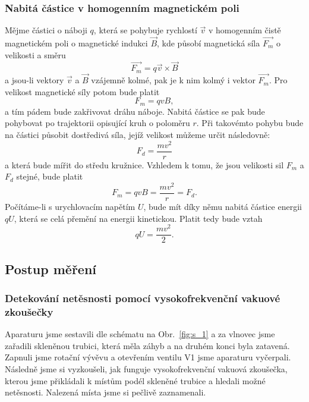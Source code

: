 \documentclass[english]{article}
\begin{document}
		\subsubsection{Nabitá částice v homogenním magnetickém poli}
			Mějme částici o náboji $q$, která se pohybuje rychlostí $\vec{v}$ v homogenním čistě magnetickém poli o magnetické indukci $\vec{B}$, kde působí magnetická síla $\vec{F_m}$ o velikosti a směru
			\begin{equation}
				\vec{F_m} = q\vec{v}\times\vec{B}
			\end{equation}
			a jsou-li vektory $\vec{v}$ a $\vec{B}$ vzájemně kolmé, pak je k nim kolmý i vektor $\vec{F_m}$. Pro velikost magnetické síly potom bude platit
			\begin{equation}
				F_m=qvB,
			\end{equation}
			a tím pádem bude zakřivovat dráhu náboje. Nabitá částice se pak bude pohybovat po trajektorii opisující kruh o poloměru $r$. Při takovémto pohybu bude na částici působit dostředivá síla, jejíž velikost můžeme určit následovně:
			\begin{equation}
				F_d=\frac{mv^2}{r}
			\end{equation}
			a která bude mířit do středu kružnice. Vzhledem k tomu, že jsou velikosti sil $F_m$ a $F_d$ stejné, bude platit
			\begin{equation}
			F_m=qvB=\frac{mv^2}{r}=F_d.
			\label{eq:1_qvB}
			\end{equation}
			Počítáme-li s urychlovacím napětím $U$, bude mít díky němu nabitá částice energii $qU$, která se celá přemění na energii kinetickou. Platit tedy bude vztah
			\begin{equation}
				qU=\frac{mv^2}{2}.
			\label{eq:2_qU}
			\end{equation}
			
	\subsection{Postup měření}
		\subsubsection{Detekování netěsnosti pomocí vysokofrekvenční vakuové zkoušečky}
			Aparaturu jsme sestavili dle schématu na Obr.~\ref{fig:s_1} a za vlnovec jsme zařadili skleněnou trubici, která měla záhyb a na druhém konci byla zatavená. Zapnuli jsme rotační vývěvu a otevřením ventilu V1 jsme aparaturu vyčerpali. Následně jsme si vyzkoušeli, jak funguje vysokofrekvenční vakuová zkoušečka, kterou jsme přikládali k místům podél skleněné trubice a hledali možné netěsnosti. Nalezená místa jsme si pečlivě zaznamenali. 
		
\end{document}

